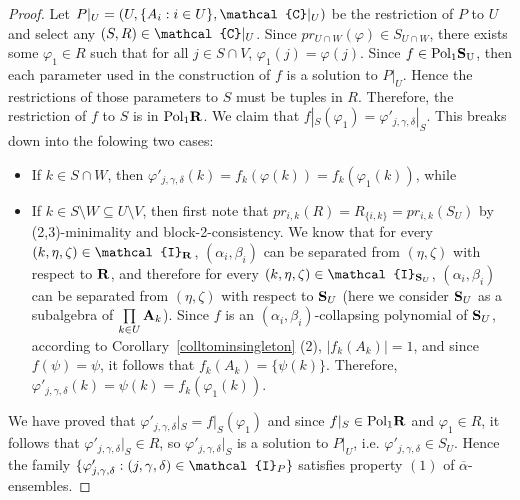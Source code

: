\documentclass[11pt]{amsart}
\newcommand{\m}[1]{{\uppercase {\mathbf {#1}}}}
\newcommand{\vr}[1]{{\uppercase {\mathcal{#1}}}}
\newcommand{\poln}[2]{{\rm Pol_{#1}\m #2}}
\theoremstyle{definition}
\begin{document}
\begin{proof}
Let $P|_U=(U,\{A_i:i\in U\},\vr c|_U)$ be the restriction of $P$ to $U$ and select any $(S,R)\in \vr c|_U$. Since $pr_{U\cap W}(\varphi)\in S_{U\cap W}$, there exists some $\varphi_1\in R$ such that for all $j\in S\cap V$, $\varphi_1(j)=\varphi(j)$. Since $f\in\poln{1}{S_U}$, then each parameter used in the construction of $f$ is a solution to $P|_U$. Hence the restrictions of those parameters to $S$ must be tuples in $R$. Therefore, the restriction of $f$ to $S$ is in $\poln{1}{r}$. We claim that $f|_S(\varphi_1)=\varphi'_{j,\gamma,\delta}|_S$. This breaks down into the folowing two cases:
\begin{itemize}
\item If $k\in S\cap W$, then $\varphi'_{j,\gamma,\delta}(k)=f_k(\varphi(k))=f_k(\varphi_1(k))$, while
\item If $k\in S\setminus W\subseteq U\setminus V$, then first note that $pr_{i,k}(R)=R_{\{i,k\}}=pr_{i,k}(S_U)$ by (2,3)-minimality and block-2-consistency. We know that for every $(k,\eta,\zeta)\in\vr i_{\m r}$, $(\alpha_i,\beta_i)$ can be separated from $(\eta,\zeta)$ with respect to $\m R$, and therefore for every $(k,\eta,\zeta)\in\vr i_{\m S_U}$, $(\alpha_i,\beta_i)$ can be separated from $(\eta,\zeta)$ with respect to $\m S_U$ (here we consider $\m S_U$ as a subalgebra of $\prod\limits_{k\in U}\m a_k$). Since $f$ is an $(\alpha_i,\beta_i)$-collapsing polynomial of $\m s_U$, according to Corollary~\ref{colltominsingleton} (2), $|f_k(A_k)|=1$, and since $f(\psi)=\psi$, it follows that $f_k(A_k)=\{\psi(k)\}$. Therefore, $\varphi'_{j,\gamma,\delta}(k)=\psi(k)=f_k(\varphi_1(k))$.
\end{itemize}
We have proved that $\varphi'_{j,\gamma,\delta}|_S=f|_S(\varphi_1)$ and since $f|_S\in\poln{1}{r}$ and $\varphi_1\in R$, it follows that $\varphi'_{j,\gamma,\delta}|_S\in R$, so $\varphi'_{j,\gamma,\delta}|_S$ is a solution to $P|_U$, i.e. $\varphi'_{j,\gamma,\delta}\in S_U$. Hence the family $\{\varphi'_{j,\gamma,\delta}:(j,\gamma,\delta)\in \vr i_P\}$ satisfies property $(1)$ of $\overline{\alpha}$-ensembles.


\end{proof}
\end{document}
